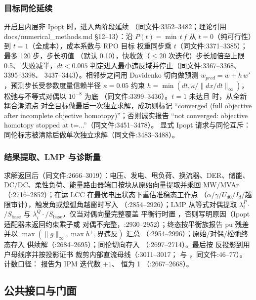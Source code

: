 \subsubsection*{目标同伦延续}
 开启且内层非 Ipopt 时，进入两阶段延续
（同文件:3352--3482；理论引用 docs/numerical\_methods.md §12--13）：沿
$P(t)=\min\,t\,f$ 从 $t=0$（纯可行性）到 $t=1$（全成本），成本系数与 RPO 目标
权重同步乘 $t$（同文件:3371--3385）；最多 120 步，步长初值
（默认 0.10），快收敛（$\le20$ 次迭代）步长加倍至上限 0.5、
失败减半，$dt<0.005$ 判定进入最小违反域并停止（同文件:3367--3368、3395--3398、
3437--3443）。相邻步之间用 Davidenko 切向做预测
$w_{pred}=w+h\,w'$，预测步长受参数度量信赖半径 $\kappa=0.05$ 约束
$h=\min(dt,\kappa/\lVert dx/dt\rVert_\infty)$，松弛与不等式对偶以 $10^{-8}$ 为底
（同文件:3399--3436）。$t=1$ 未达且  时，从全新耦合潮流点
对全目标做最后一次独立求解，成功则标记
``converged (full objective after incomplete objective homotopy)''；否则诚实报告
``not converged: objective homotopy stopped at t=...''（同文件:3451--3478）。
显式 Ipopt 请求与同伦互斥：同伦标志被清除后做单次独立求解（同文件:3483--3488）。

\subsubsection*{结果提取、LMP 与诊断量}
求解返回后（同文件:2666--3019）：电压、发电、甩负荷、换流器、DER、储能、
DC/DC、柔性负荷、能量路由器端口按块从原始向量提取并乘回 MW/MVAr
（:2716--2852）；在运 LCC 在最优电压状态下重估准稳态工作点
（$\alpha$/$\gamma$/$U_{d0}$/$I_d$/越限审计），触发角或熄弧角越窗时写入
（:2854--2926）；LMP 从等式对偶提取
$\lambda^{P}_i\cdot$$/S_{\mathrm{base}}$ 与
$\lambda^{Q}_i\cdot$$/S_{\mathrm{base}}$，仅当对偶向量完整覆盖
平衡行时置 ，否则写明原因（Ipopt 适配器未返回约束乘子或
对偶不完整，:2930--2952）；终态按平衡族报告 pu 残差并以
$\max(\lVert g\rVert_\infty,\max h^{+},\text{界违反})$ 汇总
（:2954--2996）；原始/对偶/松弛终态存入
 供续解（:2684--2695）；同伦切向存入 
（:2697--2714）。最后按  反投影到用户母线序并按投影证书
裁剪内部直流母线（:3011--3017；
与 ，同文件:46--77）。计数口径：
 报告为 IPM 迭代数 $+1$、 恒为 1
（:2667--2668）。

\subsection{公共接口与门面}\label{subsec:acopfnative:api}

